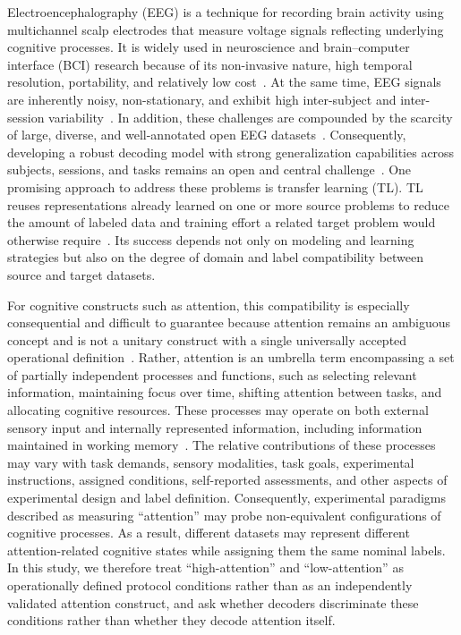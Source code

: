\documentclass[10pt,letterpaper]{article}
\newcommand{\rev}[1]{#1}
\begin{document}
Electroencephalography (EEG) is a technique for recording brain activity using multichannel scalp electrodes that measure voltage signals reflecting underlying cognitive processes. It is widely used in neuroscience and brain--computer interface (BCI) research because of its non-invasive nature, high temporal resolution, portability, and relatively low cost~\cite{rashid2020bci}. At the same time, EEG signals are inherently noisy, non-stationary, and exhibit high inter-subject and inter-session variability~\cite{wu2022transfer,siino2025rdwt}. In addition, these challenges are compounded by the scarcity of large, diverse, and well-annotated open EEG datasets~\cite{sun2025attention}. Consequently, developing a robust decoding model with strong generalization capabilities across subjects, sessions, and tasks remains an open and central challenge~\cite{li2025foundation,wu2022transfer}. One promising approach to address these problems is transfer learning (TL). TL reuses representations already learned on one or more source problems to reduce the amount of labeled data and training effort a related target problem would otherwise require~\cite{zhang2020transfer}. Its success depends not only on modeling and learning strategies but also on the degree of domain and label compatibility between source and target datasets.

For cognitive constructs such as attention, this compatibility is especially consequential and difficult to guarantee because attention remains an ambiguous concept and is not a unitary construct with a single universally accepted operational definition~\cite{sun2025attention,hommel2019noone}. Rather, attention is an umbrella term encompassing a set of partially independent processes and functions, such as selecting relevant information, maintaining focus over time, shifting attention between tasks, and allocating cognitive resources. These processes may operate on both external sensory input and internally represented information, including information maintained in working memory~\cite{hommel2019noone,knudsen2007components,petersen2012attention}. The relative contributions of these processes may vary with task demands, sensory modalities, task goals, experimental instructions, assigned conditions, self-reported assessments, and other aspects of experimental design and label definition. Consequently, experimental paradigms described as measuring ``attention'' may probe non-equivalent configurations of cognitive processes. As a result, different datasets may represent different attention-related cognitive states while assigning them the same nominal labels. \rev{In this study, we therefore treat ``high-attention'' and ``low-attention'' as operationally defined protocol conditions rather than as an independently validated attention construct, and ask whether decoders discriminate these conditions rather than whether they decode attention itself.}
\end{document}
